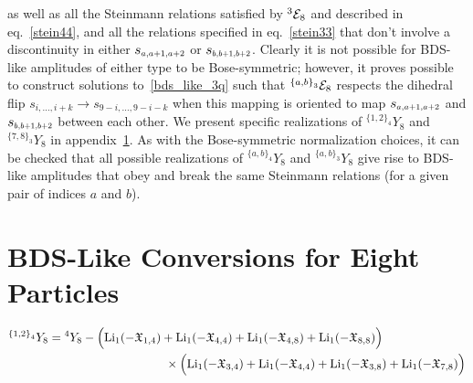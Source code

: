\documentclass[11pt]{article}
\def\mand#1{\scaleto{s}{4.6pt}_{\scaleto{#1}{5.2pt}}}
\def\EthreeJ{{}^{{\{a,b\}}_3} {\cal E}_8}
\def\LiOneCalX#1#2{\text{Li}_1(-\mathfrak{X}_{#1,#2})}
\begin{document}
as well as all the Steinmann relations satisfied by ${}^3 {\cal E}_8$ and described in eq.~\eqref{stein44}, and all the relations specified in eq.~\eqref{stein33} that don't involve a discontinuity in either $\mand{a,a+1,a+2}$ or $\mand{b,b+1,b+2}$. Clearly it is not possible for BDS-like amplitudes of either type to be Bose-symmetric; however, it proves possible to construct solutions to~\eqref{bds_like_3q} such that $\EthreeJ$ respects the dihedral flip $s_{i,\dots,i+k} \rightarrow s_{9-i,\dots,9-i-k}$ when this mapping is oriented to map $\mand{a,a+1,a+2}$ and $\mand{b,b+1,b+2}$ between each other. We present specific realizations of ${}^{{\{1,2\}}_4} Y_{8}$ and ${}^{{\{7,8\}}_3} Y_{8}$ in appendix~\ref{appendix:bds_like}. As with the Bose-symmetric normalization choices, it can be checked that all possible realizations of ${}^{{\{a,b\}}_4} Y_{8}$ and ${}^{{\{a,b\}}_3} Y_{8}$ give rise to BDS-like amplitudes that obey and break the same Steinmann relations (for a given pair of indices $a$ and $b$). 



\section{BDS-Like Conversions for Eight Particles} \label{appendix:bds_like}

 \begin{align}
{}^{{\{1,2\}}_4} Y_{8} &= {}^{4}Y_8 -
\Big( \LiOneCalX{1}{4} + \LiOneCalX{4}{4} + \LiOneCalX{4}{8} + \LiOneCalX{8}{8} \Big)  \\
&\hspace{3.4cm} \times \Big( \LiOneCalX{3}{4}+ \LiOneCalX{4}{4} + \LiOneCalX{3}{8} + \LiOneCalX{7}{8} \Big) \nonumber
\end{align}
\end{document}
